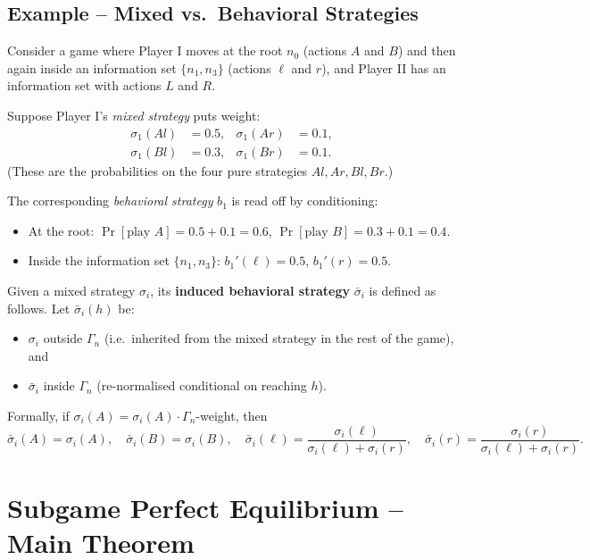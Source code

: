 \documentclass[12pt, a4paper]{article}
\begin{document}
\subsection*{Example -- Mixed vs.\ Behavioral Strategies}

Consider a game where Player I moves at the root $n_0$ (actions $A$ and $B$)
and then again inside an information set $\{n_1, n_3\}$ (actions $\ell$ and
$r$), and Player II has an information set with actions $L$ and $R$.

\medskip
\noindent Suppose Player I's \emph{mixed strategy} puts weight:
\begin{align*}
  \sigma_1(Al) &= 0.5, & \sigma_1(Ar) &= 0.1,\\
  \sigma_1(Bl) &= 0.3, & \sigma_1(Br) &= 0.1.
\end{align*}
(These are the probabilities on the four pure strategies $Al, Ar, Bl, Br$.)

\medskip
\noindent The corresponding \emph{behavioral strategy} $b_1$ is read off by
conditioning:
\begin{itemize}
  \item At the root: $\Pr[\text{play }A] = 0.5 + 0.1 = 0.6$, \quad
        $\Pr[\text{play }B] = 0.3 + 0.1 = 0.4$.
  \item Inside the information set $\{n_1,n_3\}$:
        $b_1'(\ell) = 0.5$, $b_1'(r) = 0.5$.
\end{itemize}

\medskip
\noindent Given a mixed strategy $\sigma_i$, its \textbf{induced behavioral
strategy} $\bar{\sigma}_i$ is defined as follows.  Let
$\bar{\sigma}_i(h)$ be:
\begin{itemize}
  \item $\sigma_i$ outside $\Gamma_n$ (i.e.\ inherited from the mixed
        strategy in the rest of the game), and
  \item $\bar{\sigma}_i$ inside $\Gamma_n$ (re-normalised conditional
        on reaching $h$).
\end{itemize}

Formally, if $\sigma_i(A) = \sigma_i(A) \cdot \Gamma_n$-weight, then
\[
  \bar{\sigma}_i(A) = \sigma_i(A),\quad
  \bar{\sigma}_i(B) = \sigma_i(B),\quad
  \bar{\sigma}_i(\ell) = \frac{\sigma_i(\ell)}{\sigma_i(\ell)+\sigma_i(r)},\quad
  \bar{\sigma}_i(r) = \frac{\sigma_i(r)}{\sigma_i(\ell)+\sigma_i(r)}.
\]

\section{Subgame Perfect Equilibrium -- Main Theorem}
\end{document}
